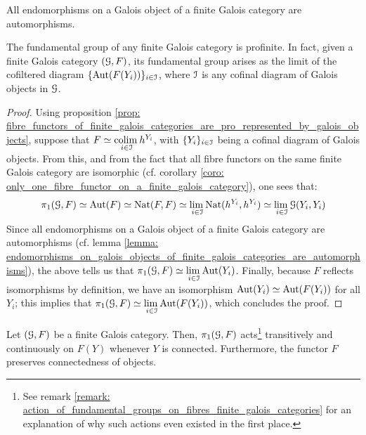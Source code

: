                \begin{lemma} \label{lemma: endomorphisms_on_galois_objects_of_finite_galois_categories_are_automorphisms}
                    \cite[pp. 100]{SGA1} All endomorphisms on a Galois object of a finite Galois category are automorphisms.
                \end{lemma}
                \begin{proposition} \label{prop: fundamental_groups_of_finite_galois_categories_are_profinite}
                    The fundamental group of any finite Galois category is profinite. In fact, given a finite Galois category $(\mathcal{G}, F)$, its fundamental group arises as the limit of the cofiltered diagram $\{\mathrm{Aut}(F(Y_i))\}_{i \in \mathcal{I}}$, where $\mathcal{I}$ is any cofinal diagram of Galois objects in $\mathcal{G}$.
                \end{proposition}
                    \begin{proof}
                        Using proposition \ref{prop: fibre_functors_of_finite_galois_categories_are_pro_represented_by_galois_objects}, suppose that $F \simeq \underset{i \in \mathcal{I}}{\operatorname{colim} \:} h^{Y_i}$, with $\{Y_i\}_{i \in \mathcal{I}}$ being a cofinal diagram of Galois objects. From this, and from the fact that all fibre functors on the same finite Galois category are isomorphic (cf. corollary \ref{coro: only_one_fibre_functor_on_a_finite_galois_category}), one sees that:
                            $$\pi_1(\mathcal{G}, F) \simeq \mathrm{Aut}(F) \simeq \mathrm{Nat}(F, F) \simeq \underset{i \in \mathcal{I}}{\operatorname{lim} \:} \mathrm{Nat}(h^{Y_i}, h^{Y_i}) \simeq \underset{i \in \mathcal{I}}{\operatorname{lim} \:} \mathcal{G}(Y_i, Y_i)$$
                        Since all endomorphisms on a Galois object of a finite Galois category are automorphisms (cf. lemma \ref{lemma: endomorphisms_on_galois_objects_of_finite_galois_categories_are_automorphisms}), the above tells us that $\pi_1(\mathcal{G}, F) \simeq \underset{i \in \mathcal{I}}{\operatorname{lim} \:} \mathrm{Aut}(Y_i)$. Finally, because $F$ reflects isomorphisms by definition, we have an isomorphism $\mathrm{Aut}(Y_i) \simeq \mathrm{Aut}(F(Y_i))$ for all $Y_i$; this implies that $\pi_1(\mathcal{G}, F) \simeq \underset{i \in \mathcal{I}}{\operatorname{lim} \:} \mathrm{Aut}(F(Y_i))$, which concludes the proof.
                    \end{proof}
                \begin{corollary} \label{coro: fundamental_groups_of_finite_galois_categories_act_transitively_on_connected_objects}
                    Let $(\mathcal{G}, F)$ be a finite Galois category. Then, $\pi_1(\mathcal{G}, F)$ acts\footnote{See remark \ref{remark: action_of_fundamental_groups_on_fibres_finite_galois_categories} for an explanation of why such actions even existed in the first place.} transitively and continuously on $F(Y)$ whenever $Y$ is connected. Furthermore, the functor $F$ preserves connectedness of objects. 
                \end{corollary}
                
